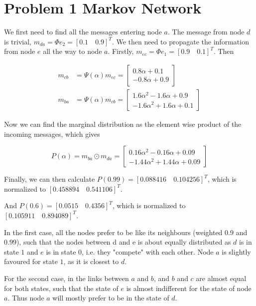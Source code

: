 \documentclass[10pt,a4paper]{article}
\begin{document}
\section*{Problem 1 Markov Network}

We first need to find all the messages entering node $a$. The message from node $d$ is trivial, $m_{da} = \Phi e_2 = [0.1 \quad 0.9]^T$. We then need to propagate the information from node $e$ all the way to node $a$. Firstly, $m_{ec} = \Phi e_1 = [0.9 \quad 0.1]^T$. Then

\begin{align*}
m_{cb} &= \Psi(\alpha) m_{ec} =
\begin{bmatrix}
	0.8\alpha + 0.1 \\ 
	-0.8\alpha + 0.9
\end{bmatrix}
\\		
m_{ba} &= \Psi(\alpha) m_{cb} = 
\begin{bmatrix}
	1.6\alpha^2 - 1.6\alpha + 0.9 \\ 
	-1.6\alpha^2 + 1.6\alpha + 0.1 
\end{bmatrix}	
\end{align*}

Now we can find the marginal distribution as the element wise product of the incoming messages, which gives

\begin{equation}
P(\alpha) = m_{ba}\odot m_{da} =
\begin{bmatrix}
	0.16\alpha^2 - 0.16\alpha + 0.09 \\ 
	-1.44\alpha^2 + 1.44\alpha + 0.09
\end{bmatrix}
\end{equation}

Finally, we can then calculate $P(0.99) = [0.088416 \quad 0.104256]^T$, which is normalized to $[0.458894 \quad 0.541106]^T$.

And $P(0.6) = [0.0515 \quad 0.4356]^T$, which is normalized to $[0.105911 \quad 0.894089]^T$.

In the first case, all the nodes prefer to be like its neighbours (weighted $0.9$ and $0.99$), such that the nodes between d and e is about equally distributed as $d$ is in state $1$ and $e$ is in state $0$, i.e. they "compete" with each other. Node $a$ is slightly favoured for state $1$, as it is closest to $d$.

For the second case, in the links between $a$ and $b$, and $b$ and $c$ are almost equal for both states, such that the state of $e$ is almost indifferent for the state of node $a$. Thus node $a$ will mostly prefer to be in the state of $d$. 
\end{document}
